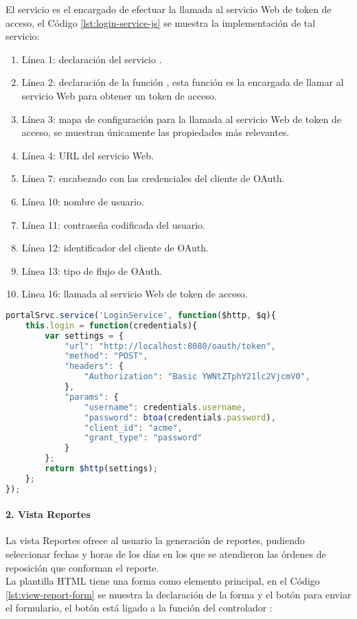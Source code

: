 El servicio  es el encargado de efectuar la llamada al servicio Web de token de acceso, el Código \ref{lst:login-service-js} se muestra la implementación de tal servicio:
\begin{enumerate}
	\item Línea 1: declaración del servicio .
	\item Línea 2: declaración de la función , esta función es la encargada de llamar al servicio Web para obtener un token de acceso.
	\item Línea 3: mapa de configuración para la llamada al servicio Web de token de acceso, se muestran únicamente las propiedades más relevantes.
	\item Línea 4: URL del servicio Web.
	\item Línea 7: encabezado con las credenciales del cliente de OAuth.
	\item Línea 10: nombre de usuario.
	\item Línea 11: contraseña codificada del usuario.
	\item Línea 12: identificador del cliente de OAuth.
	\item Línea 13: tipo de flujo de OAuth.
	\item Línea 16: llamada al servicio Web de token de acceso.
\end{enumerate}
\begin{lstlisting}[language=Javascript, caption={Servicio en AngularJS para obtener un token de acceso.}, captionpos=b, label={lst:login-service-js}]
portalSrvc.service('LoginService', function($http, $q){
	this.login = function(credentials){
		var settings = {
			"url": "http://localhost:8080/oauth/token",
			"method": "POST",
			"headers": {
				"Authorization": "Basic YWNtZTphY21lc2VjcmV0",
			},
			"params": {
				"username": credentials.username,
				"password": btoa(credentials.password),
				"client_id": "acme",
				"grant_type": "password"
			}
		};
		return $http(settings);
	};
});
\end{lstlisting}

\paragraph{2. Vista Reportes\\}
La vista Reportes ofrece al usuario la generación de reportes, pudiendo seleccionar fechas y horas de los días en los que se atendieron las órdenes de reposición que conforman el reporte.\\
La plantilla HTML tiene una forma como elemento principal, en el Código \ref{lst:view-report-form} se muestra la declaración de la forma y el botón para enviar el formulario, el botón está ligado a la función  del controlador :

